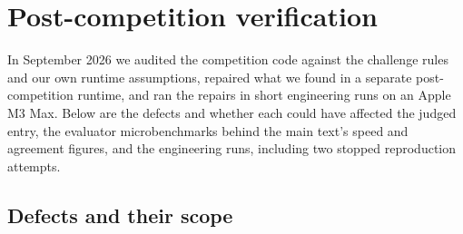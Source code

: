 \section{Post-competition verification}\label{app:verification}

In September 2026 we audited the competition code against the challenge rules and
our own runtime assumptions, repaired what we found in a separate post-competition
runtime, and ran the repairs in short engineering runs on an Apple M3 Max. Below are
the defects and whether each could have affected the judged entry, the evaluator
microbenchmarks behind the main text's speed and agreement figures, and the
engineering runs, including two stopped reproduction attempts.

\subsection{Defects and their scope}\label{app:defects}

